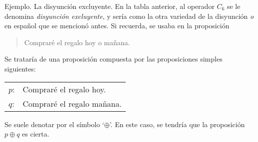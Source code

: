 Ejemplo. La disyunción excluyente. En la tabla anterior, al operador $C_6$
se le denomina \emph{disyunción excluyente}, y sería como la otra variedad
de la disyunción \emph{o} en español que se mencionó antes. Si recuerda, se
usaba en la proposición

\begin{quote}
  Compraré el regalo hoy o mañana.
\end{quote}

\noindent Se trataría de una proposición compuesta por las proposiciones
simples siguientes:

\begin{tabular}{ll}
  $p$: & Compraré el regalo hoy. \\
  $q$: & Compraré el regalo mañana. \\
\end{tabular}

Se suele denotar por el símbolo `$\oplus$'. En este caso, se tendría que la
proposición $p \oplus q$ es cierta.




